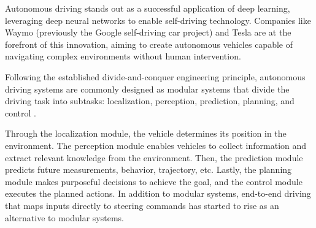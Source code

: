 

Autonomous driving stands out as a successful application of deep learning, leveraging deep neural networks to enable self-driving technology. Companies like Waymo (previously the Google self-driving car project) and Tesla are at the forefront of this innovation, aiming to create autonomous vehicles capable of navigating complex environments without human intervention.


Following the established divide-and-conquer engineering principle, autonomous driving systems are commonly designed as modular systems that divide the driving task into subtasks: localization, perception, prediction, planning, and control \citep{pendleton2017perception}. 

Through the localization module, the vehicle determines its position in the environment. The perception module enables vehicles to collect information and extract relevant knowledge from the environment. Then, the prediction module predicts future measurements, behavior, trajectory, etc. Lastly, the planning module makes purposeful decisions to achieve the goal, and the control module executes the planned actions. In addition to modular systems, end-to-end driving that maps inputs directly to steering commands has started to rise as an alternative to modular systems.

